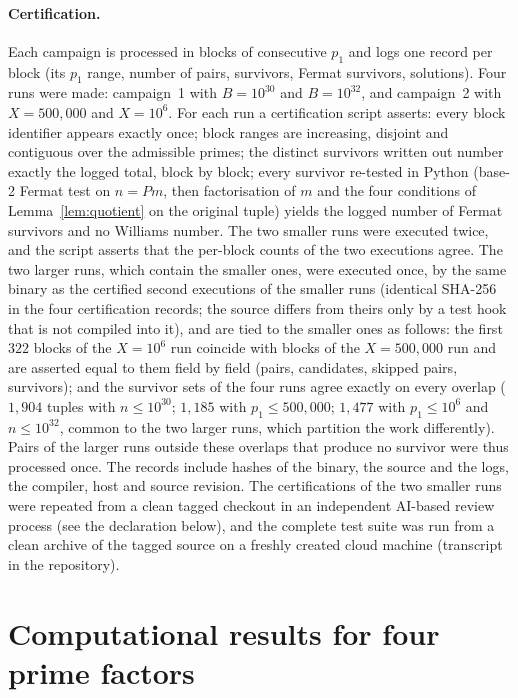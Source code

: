 \documentclass[11pt]{amsart}
\theoremstyle{definition}
\theoremstyle{remark}
\begin{document}
\paragraph{Certification.} Each campaign is processed in blocks of consecutive $p_1$ and logs one record per block (its $p_1$ range, number of pairs, survivors, Fermat survivors, solutions). Four runs were made: campaign~1 with $B=10^{30}$ and $B=10^{32}$, and campaign~2 with $X=500{,}000$ and $X=10^{6}$. For each run a certification script asserts: every block identifier appears exactly once; block ranges are increasing, disjoint and contiguous over the admissible primes; the distinct survivors written out number exactly the logged total, block by block; every survivor re-tested in Python (base-2 Fermat test on $n=Pm$, then factorisation of $m$ and the four conditions of Lemma~\ref{lem:quotient} on the original tuple) yields the logged number of Fermat survivors and no Williams number. The two smaller runs were executed twice, and the script asserts that the per-block counts of the two executions agree. The two larger runs, which contain the smaller ones, were executed once, by the same binary as the certified second executions of the smaller runs (identical SHA-256 in the four certification records; the source differs from theirs only by a test hook that is not compiled into it), and are tied to the smaller ones as follows: the first $322$ blocks of the $X=10^6$ run coincide with blocks of the $X=500{,}000$ run and are asserted equal to them field by field (pairs, candidates, skipped pairs, survivors); and the survivor sets of the four runs agree exactly on every overlap ($1{,}904$ tuples with $n\le10^{30}$; $1{,}185$ with $p_1\le500{,}000$; $1{,}477$ with $p_1\le10^6$ and $n\le10^{32}$, common to the two larger runs, which partition the work differently). Pairs of the larger runs outside these overlaps that produce no survivor were thus processed once. The records include hashes of the binary, the source and the logs, the compiler, host and source revision. The certifications of the two smaller runs were repeated from a clean tagged checkout in an independent AI-based review process (see the declaration below), and the complete test suite was run from a clean archive of the tagged source on a freshly created cloud machine (transcript in the repository).

\section{Computational results for four prime factors}\label{sec:results}
\end{document}
